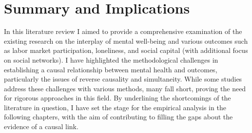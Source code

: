 \section{Summary and Implications}
In this literature review I aimed to provide a comprehensive examination of the existing research on the interplay of mental well-being and various outcomes such as labor market participation, loneliness, and social capital (with additional focus on social networks). I have highlighted the methodological challenges in establishing a causal relationship between mental health and outcomes, particularly the issues of reverse causality and simultaneity. While some studies address these challenges with various methods, many fall short, proving the need for rigorous approaches in this field. By underlining the shortcomings of the literature in question, I have set the stage for the empirical analysis in the following chapters, with the aim of contributing to filling the gaps about the evidence of a causal link. 



